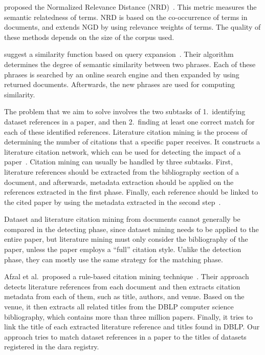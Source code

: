 \documentclass{IOS-Book-Article}
\newcommand{\dara}{\textsf{da\textbar ra}}
\begin{document}
\citeauthor{Schaefer2014} proposed the Normalized Relevance Distance (NRD)~\citeyearpar{Schaefer2014}.
This metric measures the semantic relatedness of terms.
NRD is based on the co-occurrence of terms in documents, and extends NGD by using relevance weights of terms.
The quality of these methods depends on the size of the corpus used.

\citeauthor{Sahami2006} suggest a similarity function based on query expansion~\citeyearpar{Sahami2006}.
Their algorithm determines the degree of semantic similarity between two phrases.
Each of these phrases is searched by an online search engine and then expanded by using returned documents.
Afterwards, the new phrases are used for computing similarity. 

The problem that we aim to solve involves the two subtasks of 1.\ identifying dataset references in a paper, and then 2.\ finding at least one correct match for each of these identified references.
Literature citation mining is the process of determining the number of citations that a specific paper receives.
It constructs a literature citation network, which can be used for detecting the impact of a paper~\cite{Afzal2010}.
Citation mining can usually be handled by three subtasks.
First, literature references should be extracted from the bibliography section of a document, and afterwards, metadata extraction should be applied on the references extracted in the first phase.
Finally, each reference should be linked to the cited paper by using the metadata extracted in the second step~\cite{Afzal2010}.

Dataset and literature citation mining from documents cannot generally be compared in the detecting phase, since dataset mining needs to be applied to the entire paper, but literature mining must only consider the bibliography of the paper, unless the paper employs a “full” citation style.
Unlike the detection phase, they can mostly use the same strategy for the matching phase. 

Afzal et al.\ proposed a rule-based citation mining technique~\cite{Afzal2010}.
Their approach detects literature references from each document and then extracts citation metadata from each of them, such as title, authors, and venue. Based on the venue, it then extracts all related titles from the DBLP computer science bibliography, which contains more than three million papers.
Finally, it tries to link the title of each extracted literature reference and titles found in DBLP.
Our approach tries to match dataset references in a paper to the titles of datasets registered in the {\dara} registry.
\end{document}
